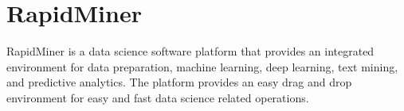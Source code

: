 \section{RapidMiner}

RapidMiner is a data science software platform that provides an integrated environment for data preparation, machine learning, deep learning, text mining, and predictive analytics. The platform provides an easy drag and drop environment for easy and fast data science related operations. \cites{hid-sp18-511-rapidminer}
